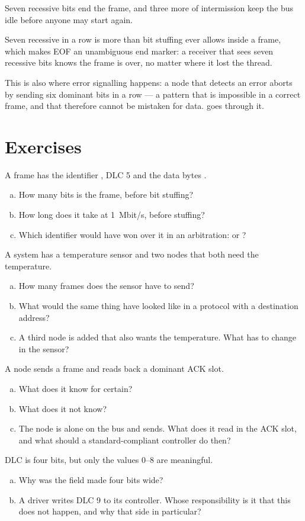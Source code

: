 Seven recessive bits end the frame, and three more of intermission keep the bus idle before anyone
may start again.

Seven recessive in a row is more than bit stuffing ever allows inside a frame, which makes EOF an
unambiguous end marker: a receiver that sees seven recessive bits knows the frame is over, no
matter where it lost the thread.

This is also where error signalling happens: a node that detects an error aborts by sending six
dominant bits in a row --- a pattern that is impossible in a correct frame, and that therefore
cannot be mistaken for data.  goes through it.

\section*{Exercises}

\label{ex:2:1}
A frame has the identifier , DLC 5 and the data bytes .
\begin{enumerate}[a)]
  \item How many bits is the frame, before bit stuffing?
  \item How long does it take at 1~Mbit/s, before stuffing?
  \item Which identifier would have won over it in an arbitration:  or
    ?
\end{enumerate}

\label{ex:2:2}
A system has a temperature sensor and two nodes that both need the temperature.
\begin{enumerate}[a)]
  \item How many frames does the sensor have to send?
  \item What would the same thing have looked like in a protocol with a destination address?
  \item A third node is added that also wants the temperature. What has to change in the sensor?
\end{enumerate}

\label{ex:2:3}
A node sends a frame and reads back a dominant ACK slot.
\begin{enumerate}[a)]
  \item What does it know for certain?
  \item What does it not know?
  \item The node is alone on the bus and sends. What does it read in the ACK slot, and what should a
    standard-compliant controller do then?
\end{enumerate}

\label{ex:2:4}
DLC is four bits, but only the values 0--8 are meaningful.
\begin{enumerate}[a)]
  \item Why was the field made four bits wide?
  \item A driver writes DLC 9 to its controller. Whose responsibility is it that this does not
    happen, and why that side in particular?
\end{enumerate}
